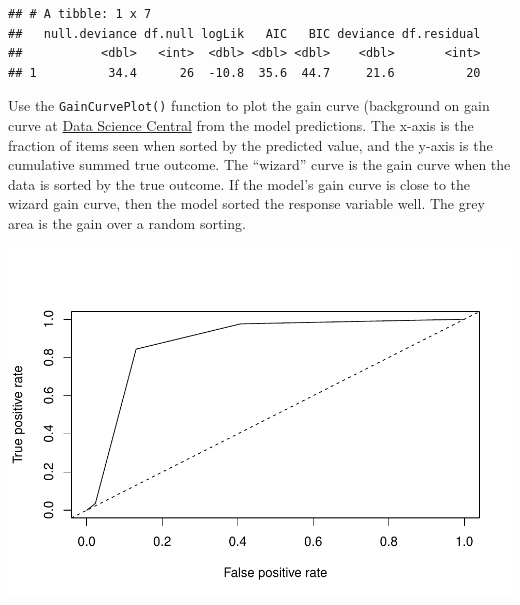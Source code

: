 \documentclass[
]{book}
\newenvironment{Shaded}{\begin{snugshade}}{\end{snugshade}}
\newcommand{\DataTypeTok}[1]{\textcolor[rgb]{0.13,0.29,0.53}{#1}}
\newcommand{\KeywordTok}[1]{\textcolor[rgb]{0.13,0.29,0.53}{\textbf{#1}}}
\newcommand{\NormalTok}[1]{#1}
\newcommand{\OperatorTok}[1]{\textcolor[rgb]{0.81,0.36,0.00}{\textbf{#1}}}
\newcommand{\StringTok}[1]{\textcolor[rgb]{0.31,0.60,0.02}{#1}}
\begin{document}
\begin{verbatim}
## # A tibble: 1 x 7
##   null.deviance df.null logLik   AIC   BIC deviance df.residual
##           <dbl>   <int>  <dbl> <dbl> <dbl>    <dbl>       <int>
## 1          34.4      26  -10.8  35.6  44.7     21.6          20
\end{verbatim}

Use the \texttt{GainCurvePlot()} function to plot the gain curve (background on gain curve at \href{https://www.datasciencecentral.com/profiles/blogs/understanding-and-interpreting-gain-and-lift-charts}{Data Science Central} from the model predictions. The x-axis is the fraction of items seen when sorted by the predicted value, and the y-axis is the cumulative summed true outcome. The ``wizard'' curve is the gain curve when the data is sorted by the true outcome. If the model's gain curve is close to the wizard gain curve, then the model sorted the response variable well. The grey area is the gain over a random sorting.

\begin{Shaded}
\end{Shaded}

\includegraphics{data-sci_files/figure-latex/unnamed-chunk-45-1.pdf}
\end{document}
